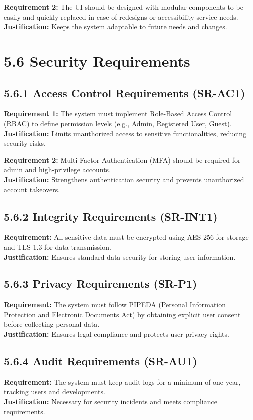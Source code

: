 \documentclass[]{article}
\begin{document}
\textbf{Requirement 2:} The UI should be designed with modular components to be easily and quickly replaced in case of redesigns or accessibility service needs.\\
\textbf{Justification:} Keeps the system adaptable to future needs and changes.

\section*{5.6 Security Requirements}

\subsection*{5.6.1 Access Control Requirements (SR-AC1)}
\textbf{Requirement 1:} The system must implement Role-Based Access Control (RBAC) to define permission levels (e.g., Admin, Registered User, Guest).\\
\textbf{Justification:} Limits unauthorized access to sensitive functionalities, reducing security risks.

\textbf{Requirement 2:} Multi-Factor Authentication (MFA) should be required for admin and high-privilege accounts.\\
\textbf{Justification:} Strengthens authentication security and prevents unauthorized account takeovers.

\subsection*{5.6.2 Integrity Requirements (SR-INT1)}
\textbf{Requirement:} All sensitive data must be encrypted using AES-256 for storage and TLS 1.3 for data transmission.\\
\textbf{Justification:} Ensures standard data security for storing user information.

\subsection*{5.6.3 Privacy Requirements (SR-P1)}
\textbf{Requirement:} The system must follow PIPEDA (Personal Information Protection and Electronic Documents Act) by obtaining explicit user consent before collecting personal data.\\
\textbf{Justification:} Ensures legal compliance and protects user privacy rights.

\subsection*{5.6.4 Audit Requirements (SR-AU1)}
\textbf{Requirement:} The system must keep audit logs for a minimum of one year, tracking users and developments.\\
\textbf{Justification:} Necessary for security incidents and meets compliance requirements.
\end{document}
